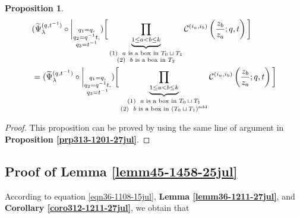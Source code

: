 \documentclass[12pt,reqno,a4paper]{amsart}
\newcommand{\comp}{\circ}
\newcommand{\cals}[1]{\mathcal{#1}}
\numberwithin{equation}{section}
\newtheorem{prop}[thm]{Proposition}
\theoremstyle{definition}
\begin{document}
\begin{prop}\mbox{}
\label{prp314-1219-27jul}
	\footnotesize
	\begin{align}
		&(
		\widetilde{\Psi}_{\lambda}^{(q,t^{-1})}
		\comp 
		\bigg|_{
			\substack{
				q_1 = q, \\
				q_2 = q^{-1}t,\\
				q_3 = t^{-1} \\
			}
		}
		)
		\bigg[
		\underbrace{	\prod_{1 \leq a < b \leq k}				}_{
			\substack{
				(1) \,\, \text{ $a$ is a box in $T_0 \sqcup T_1$}
				\\
				(2) \,\, \text{ $b$ is a box in $T_2$}
			}
		}
		\cals{C}^{(i_a,i_b)}\left(
		\frac{z_b}{z_a}
		; q, t
		\right)
		\bigg]
		\\
		&=
		(
		\widetilde{\Psi}_{\lambda}^{(q,t^{-1})}
		\comp 
		\bigg|_{
			\substack{
				q_1 = q, \\
				q_2 = q^{-1}t,\\
				q_3 = t^{-1} \\
			}
		}
		)
		\bigg[
		\underbrace{	\prod_{1 \leq a < b \leq k}				}_{
			\substack{
				(1) \,\, \text{ $a$ is a box in $T_0 \sqcup T_1$}
				\\
				(2) \,\, \text{ $b$ is a box in $(T_0 \sqcup T_1)^{\operatorname{add}}$}
			}
		}
		\cals{C}^{(i_a,i_b)}\left(
		\frac{z_b}{z_a}
		; q, t
		\right)
		\bigg] 
		\notag 
	\end{align}
	\normalsize
\end{prop}
\begin{proof}
This proposition can be proved by using the same line of argument in \textbf{Proposition \ref{prp313-1201-27jul}}. 
\end{proof}

\subsection{Proof of Lemma \ref{lemm45-1458-25jul}}

According to equation \eqref{eqn36-1108-15jul}, \textbf{Lemma \ref{lemm36-1211-27jul}}, and \textbf{Corollary \ref{coro312-1211-27jul}}, we obtain that 
\end{document}

